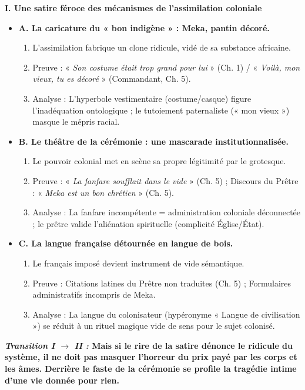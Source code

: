 \documentclass[11pt]{article}
\begin{document}
\begin{exoresolu}
\textbf{I. Une satire féroce des mécanismes de l'assimilation coloniale}
\begin{itemize}
    \item \textbf{A. La caricature du « bon indigène » : Meka, pantin décoré.}
    \begin{enumerate}
        \item L'assimilation fabrique un clone ridicule, vidé de sa substance africaine.
        \item Preuve : « \emph{Son costume était trop grand pour lui} » (Ch. 1) / « \emph{Voilà, mon vieux, tu es décoré} » (Commandant, Ch. 5).
        \item Analyse : L'hyperbole vestimentaire (costume/casque) figure l'inadéquation ontologique ; le tutoiement paternaliste (« mon vieux ») masque le mépris racial.
    \end{enumerate}
    \item \textbf{B. Le théâtre de la cérémonie : une mascarade institutionnalisée.}
    \begin{enumerate}
        \item Le pouvoir colonial met en scène sa propre légitimité par le grotesque.
        \item Preuve : « \emph{La fanfare soufflait dans le vide} » (Ch. 5) ; Discours du Prêtre : « \emph{Meka est un bon chrétien} » (Ch. 5).
        \item Analyse : La fanfare incompétente = administration coloniale déconnectée ; le prêtre valide l'aliénation spirituelle (complicité Église/État).
    \end{enumerate}
    \item \textbf{C. La langue française détournée en langue de bois.}
    \begin{enumerate}
        \item Le français imposé devient instrument de vide sémantique.
        \item Preuve : Citations latines du Prêtre non traduites (Ch. 5) ; Formulaires administratifs incompris de Meka.
        \item Analyse : La langue du colonisateur (hypéronyme « Langue de civilisation ») se réduit à un rituel magique vide de sens pour le sujet colonisé.
    \end{enumerate}
\end{itemize}

\textbf{\textit{Transition I $\to$ II :} Mais si le rire de la satire dénonce le ridicule du système, il ne doit pas masquer l'horreur du prix payé par les corps et les âmes. Derrière le faste de la cérémonie se profile la tragédie intime d'une vie donnée pour rien.}


\end{exoresolu}
\end{document}

